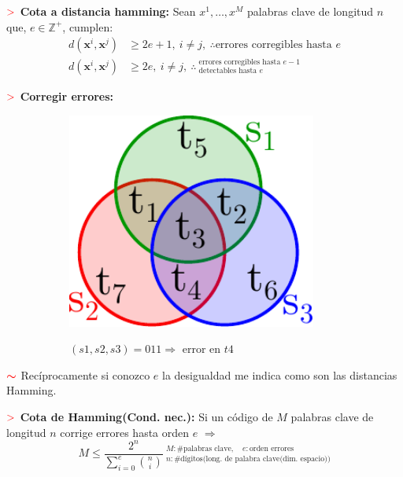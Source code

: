 \documentclass[%
 reprint,
 amsmath,amssymb,
 aps,
]{revtex4-1}
\begin{document}
\textbf{$\textcolor{red}{\mathbf{>}}$ Cota a distancia hamming:} 
Sean $x^{1}, \ldots, x^{M}$ palabras clave de longitud $n$ que, $e \in \mathbb{Z}^+$, cumplen:
$$
\begin{aligned}
  d\left(\boldsymbol{x}^{i}, \boldsymbol{x}^{j}\right) &\geq 2 e+1, \ i \neq j, \ \boldsymbol{\therefore}\text{errores corregibles hasta $e$}\\
  d\left(\boldsymbol{x}^{i}, \boldsymbol{x}^{j}\right) &\geq 2 e, \ i \neq j, \ \boldsymbol{\therefore} \ 
  ^\text{errores corregibles hasta $e-1$}_\text{detectables hasta $e$} 
\end{aligned}
$$

\textbf{$\textcolor{red}{\mathbf{>}}$ Corregir errores:} 
\begin{figure}[!ht]
  \begin{subfigure}{0.1\textwidth}
    \centering
    \includegraphics[width = 0.9\textwidth]{parity.pdf}
  \end{subfigure}\qquad
  \begin{subfigure}{0.2\textwidth}
    $(s1,s2,s3)=011 \Rightarrow$ error en $t4$
  \end{subfigure}
\end{figure}

\textbf{$\textcolor{red}{\color{red}{\boldsymbol{\sim}}}$} Recíprocamente si conozco $e$ la desigualdad me indica como son las distancias Hamming.

\textbf{$\textcolor{red}{\mathbf{>}}$ Cota de Hamming(Cond. nec.):} 
Si un código de $M$ palabras clave de longitud $n$ corrige errores hasta orden $e$ $\Rightarrow$
$$
M \leq \frac{2^{n}}{\sum_{i=0}^{e}{n \choose i}} \ 
^{M: \#\text{palabras clave}, \quad e:\text{orden errores}}_{n: \#\text{dígitos(long. de palabra clave(dim. espacio))}}
$$
\end{document}
